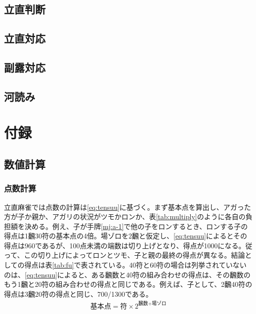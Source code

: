 \documentclass[10pt, twocolumn, notitlepage]{report}
\begin{document}
\section{立直判断}


\section{立直対応}


\section{副露対応}


\section{河読み}




\chapter*{付録}

\section{数値計算}

\subsection{点数計算} \label{sec:point}

立直麻雀では点数の計算は\eqref{eq:tensuu}に基づく。まず基本点を算出し、アガった方が子か親か、アガリの状況がツモかロンか、表\ref{tab:multiply}のように各自の負担額を決める。例え、子が手牌\ref{mj:a-1}で他の子をロンするとき、ロンする子の得点は1飜30符の基本点の4倍。場ゾロを2飜と仮定し、\eqref{eq:tensuu}によるとその得点は960であるが、100点未満の端数は切り上げとなり、得点が1000になる。従って、この切り上げによってロンとツモ、子と親の最終の得点が異なる。結論としての得点は表\ref{tab:fu}で表されている。40符と60符の場合は列挙されていないのは、\eqref{eq:tensuu}によると、ある飜数と40符の組み合わせの得点は、その飜数のもう1飜と20符の組み合わせの得点と同じである。例えば、子として、2飜40符の得点は3飜20符の得点と同じ、700/1300である。
%
\begin{align}
  \text{基本点} = \text{符} \times 2^{\text{飜数} + \text{場ゾロ}} \label{eq:tensuu}
\end{align}
\end{document}
